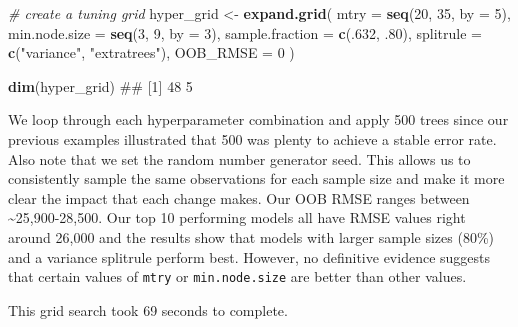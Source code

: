 \documentclass[]{book}
\newenvironment{Shaded}{\begin{snugshade}}{\end{snugshade}}
\newcommand{\CommentTok}[1]{\textcolor[rgb]{0.56,0.35,0.01}{\textit{#1}}}
\newcommand{\DataTypeTok}[1]{\textcolor[rgb]{0.13,0.29,0.53}{#1}}
\newcommand{\DecValTok}[1]{\textcolor[rgb]{0.00,0.00,0.81}{#1}}
\newcommand{\FloatTok}[1]{\textcolor[rgb]{0.00,0.00,0.81}{#1}}
\newcommand{\KeywordTok}[1]{\textcolor[rgb]{0.13,0.29,0.53}{\textbf{#1}}}
\newcommand{\NormalTok}[1]{#1}
\newcommand{\StringTok}[1]{\textcolor[rgb]{0.31,0.60,0.02}{#1}}
\theoremstyle{definition}
\theoremstyle{definition}
\theoremstyle{definition}
\theoremstyle{remark}
\begin{document}
\begin{Shaded}
\begin{Highlighting}[]
\CommentTok{# create a tuning grid}
\NormalTok{hyper_grid <-}\StringTok{ }\KeywordTok{expand.grid}\NormalTok{(}
  \DataTypeTok{mtry            =} \KeywordTok{seq}\NormalTok{(}\DecValTok{20}\NormalTok{, }\DecValTok{35}\NormalTok{, }\DataTypeTok{by =} \DecValTok{5}\NormalTok{),}
  \DataTypeTok{min.node.size   =} \KeywordTok{seq}\NormalTok{(}\DecValTok{3}\NormalTok{, }\DecValTok{9}\NormalTok{, }\DataTypeTok{by =} \DecValTok{3}\NormalTok{),}
  \DataTypeTok{sample.fraction =} \KeywordTok{c}\NormalTok{(.}\DecValTok{632}\NormalTok{, }\FloatTok{.80}\NormalTok{),}
  \DataTypeTok{splitrule       =} \KeywordTok{c}\NormalTok{(}\StringTok{"variance"}\NormalTok{, }\StringTok{"extratrees"}\NormalTok{),}
  \DataTypeTok{OOB_RMSE        =} \DecValTok{0}
\NormalTok{)}

\KeywordTok{dim}\NormalTok{(hyper_grid)}
\NormalTok{## [1] 48  5}
\end{Highlighting}
\end{Shaded}

We loop through each hyperparameter combination and apply 500 trees
since our previous examples illustrated that 500 was plenty to achieve a
stable error rate. Also note that we set the random number generator
seed. This allows us to consistently sample the same observations for
each sample size and make it more clear the impact that each change
makes. Our OOB RMSE ranges between \textasciitilde{}25,900-28,500. Our
top 10 performing models all have RMSE values right around 26,000 and
the results show that models with larger sample sizes (80\%) and a
variance splitrule perform best. However, no definitive evidence
suggests that certain values of \texttt{mtry} or \texttt{min.node.size}
are better than other values.

\begin{warning}
This grid search took 69 seconds to complete.
\end{warning}
\end{document}
